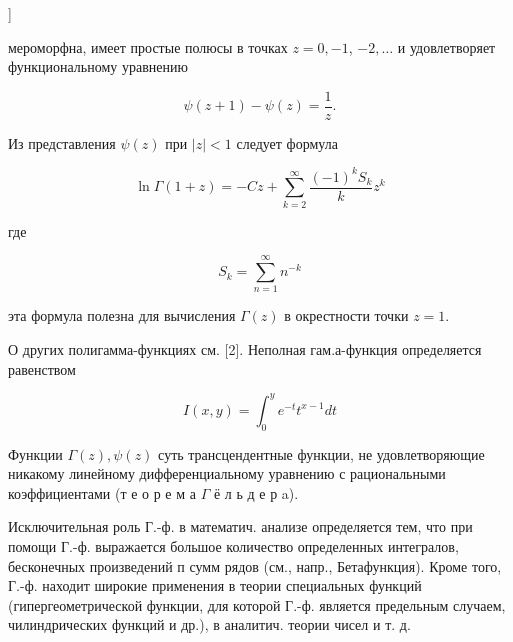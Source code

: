 \documentclass[10pt]{article}
\begin{document}
]



мероморфна, имеет простые полюсы в точках $z=0,-1$, $-2, \ldots$ и удовлетворяет функциональному уравнению



\[

\psi(z+1)-\psi(z)=\frac{1}{z} .

\]



Из представления $\psi(z)$ при $|z|<1$ следует формула



\[

\ln \Gamma(1+z)=-C z+\sum_{k=2}^{\infty} \frac{(-1)^{k} S_{k}}{k} z^{k}

\]



где



\[

S_{k}=\sum_{n=1}^{\infty} n^{-k}

\]



эта формула полезна для вычисления $\Gamma(z)$ в окрестности точки $z=1$.



О других полигамма-функциях см. [2]. Неполная гам.а-функция определяется равенством



\[

I(x, y)=\int_{0}^{y} e^{-t} t^{x-1} d t

\]



Функции $\Gamma(z), \psi(z)$ суть трансцендентные функции, не удовлетворяющие никакому линейному дифференциальному уравнению с рациональными коэффициентами (т е о р е м а $\Gamma$ ё л ь д е р a).



Исключительная роль Г.-ф. в математич. анализе определяется тем, что при помощи Г.-ф. выражается большое количество определенных интегралов, бесконечных произведений п сумм рядов (см., напр., Бетафункция). Кроме того, Г.-ф. находит широкие применения в теории специальных функций (гипергеометрической функции, для которой Г.-ф. является предельным случаем, чилиндрических функций и др.), в аналитич. теории чисел и т. д.
\end{document}

